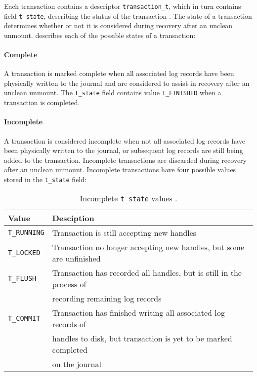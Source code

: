 Each transaction contains a descriptor \texttt{transaction_t}, which in turn contains field \texttt{t_state}, describing the status of the transaction \citep{Bovet2006}. The state of a transaction determines whether or not it is considered during recovery after an unclean unmount. \citet[p. 771]{Bovet2006} describes each of the possible states of a transaction:

\paragraph{Complete}

A transaction is marked complete when all associated log records have been physically written to the journal and are considered to assist in recovery after an unclean unmount. The \texttt{t_state} field contains value \texttt{T_FINISHED} when a transaction is completed.

\paragraph{Incomplete}

A transaction is considered incomplete when not all associated log records have been physically written to the journal, or subsequent log records are still being added to the transaction. Incomplete transactions are discarded during recovery after an unclean unmount. Incomplete transactions have four possible values stored in the \texttt{t_state} field:

\begin{table}[H]
\centering
\caption{Incomplete \texttt{t_state} values \citep[p. 771-772]{Bovet2006}.}
\begin{tabular}{l|l}
Value							& Desciption\\ \hline
\texttt{T_RUNNING}	& Transaction is still accepting new handles \\
\texttt{T_LOCKED}	& Transaction no longer accepting new handles, but some are unfinished \\
\texttt{T_FLUSH}	& Transaction has recorded all handles, but is still in the process of \\ & recording remaining log records \\
\texttt{T_COMMIT}	& Transaction has finished writing all associated log records of \\ & handles to disk, but transaction is yet to be marked completed \\ & on the journal
\end{tabular}
\end{table}

